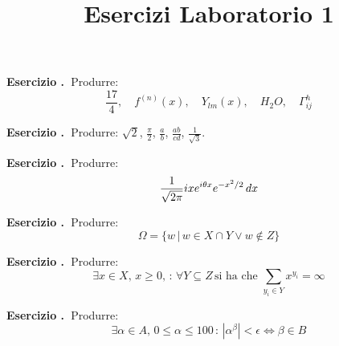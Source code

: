\documentclass[12pt]{article}
\title{Esercizi Laboratorio 1}
\newcounter{exno}
\newcommand{\exnume}{\par\smallskip
\noindent\addtocounter{exno}{1}%
{\bf Esercizio \theexno.\ }}
\begin{document}
\maketitle



\exnume Produrre:
$$
\frac{17}4,\quad f^{(n)}(x),\quad Y_{lm}(x),\quad H_2O,\quad \Gamma_{ij}^h
$$
\bigskip

\exnume Produrre: $\sqrt{2}$,
$\frac\pi2$, $\frac ab$, $\frac {ab}{cd}$, $\frac1{\sqrt{3}}$.

\bigskip
\exnume Produrre:
$$
{1\over \sqrt{2\pi}} ix e^{i\theta x}
e^{-{x^2/ 2}}\,dx
$$ 
\bigskip
\exnume Produrre:
$$
\Omega=\{ w \, | \,  w\in X\cap Y \vee w \not\in Z\}
$$


\bigskip
\exnume Produrre:
$$
\exists x \in X,  \, x\geq 0, \, : \, \forall  Y\subseteq Z \, \mbox{si ha che }\sum_{y_i\in Y} x^{y_i}= \infty
$$

\bigskip
\exnume Produrre:
$$
\exists \alpha \in A,  \,0\leq \alpha \leq 100 \, : \, |\alpha^\beta| <\epsilon \Longleftrightarrow \beta\in B
$$
\end{document}
